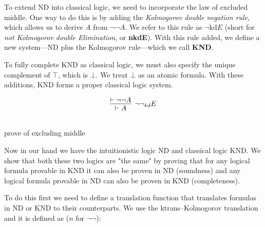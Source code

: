 \documentclass{article}
\begin{document}
To extend ND into classical logic, we need to incorporate the law of excluded middle. One way to do this is by adding the \emph{Kolmogorov double negation rule}, which allows us to derive $A$ from $\neg\neg A$. We refer to this rule as $\neg\text{kd}E$ (short for \emph{not Kolmogorov double Elimination}, or \textbf{nkdE}). With this rule added, we define a new system—ND plus the Kolmogorov rule—which we call \textbf{KND}.

To fully complete KND as classical logic, we must also specify the unique complement of $\top$, which is $\bot$. We treat $\bot$ as an atomic formula. With these additions, KND forms a proper classical logic system.

\[
\infer[\neg\neg_{kd}E]{\vdash A}{\vdash \neg\neg A}
\]

\begin{center}
\\
\vspace{1em}
prove of excluding middle

\end{center}





Now in our hand we have the intuitionistic logic ND
 and classical logic KND. We show that both these two
  logics are "the same" by proving that for any logical formula provable in KND it can also be proven in ND (soundness) and any logical formula provable in ND can also be proven in KND (completeness).

To do this first we need to define a translation function that translates formulas in ND or KND to their counterparts. We use the ktrans--Kolmogorov translation and it is defined as ($n$ for $\neg\neg$):
\end{document}
